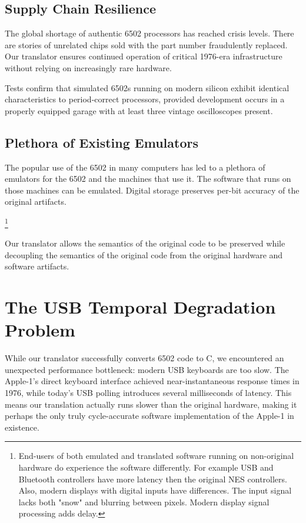 \documentclass[10pt,twocolumn]{article}
\begin{document}
\subsection{Supply Chain Resilience}
The global shortage of authentic 6502 processors has reached crisis levels.  There are stories of unrelated chips sold with the part number fraudulently replaced.  Our translator ensures continued operation of critical 1976-era infrastructure without relying on increasingly rare hardware.

Tests confirm that simulated 6502s running on modern silicon exhibit identical characteristics to period-correct processors, provided development occurs in a properly equipped garage with at least three vintage oscilloscopes present.

\subsection{Plethora of Existing Emulators}
The popular use of the 6502 in many computers has led to a plethora of emulators for the 6502 and the machines that use it.  The software that runs on those machines can be emulated.  Digital storage preserves per-bit accuracy of the original artifacts.

\footnote{End-users of both emulated and translated software running on non-original hardware do experience the software differently.  For example USB and Bluetooth controllers have more latency then the original NES controllers.  Also, modern displays with digital inputs have differences.  The input signal lacks both "snow" and blurring between pixels.  Modern display signal processing adds delay.}

Our translator allows the semantics of the original code to be preserved while decoupling the semantics of the original code from the original hardware and software artifacts.

\section{The USB Temporal Degradation Problem}
While our translator successfully converts 6502 code to C, we encountered an unexpected performance bottleneck: modern USB keyboards are too slow. The Apple-1's direct keyboard interface achieved near-instantaneous response times in 1976, while today's USB polling introduces several milliseconds of latency. This means our translation actually runs slower than the original hardware, making it perhaps the only truly cycle-accurate software implementation of the Apple-1 in existence.
\end{document}
